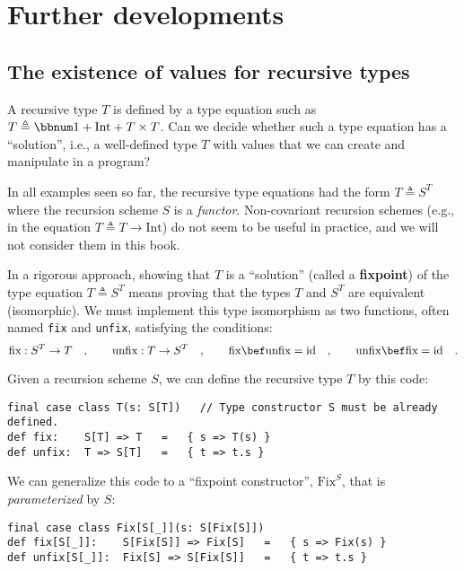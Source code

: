 \section{Further developments}

\subsection{The existence of values for recursive types\label{subsec:Recursive-types-and-the-existence-of-their-values}}

A recursive type $T$ is defined by a type equation such as $T\triangleq\bbnum 1+\text{Int}+T\times T$.
Can we decide whether such a type equation has a \textsf{``}solution\textsf{''}, i.e.,
a well-defined type $T$ with values that we can create and manipulate
in a program?

In all examples seen so far, the recursive type equations
had the form $T\triangleq S^{T}$ where the recursion scheme $S$
is a \emph{functor}. Non-covariant recursion schemes (e.g., in the
equation $T\triangleq T\rightarrow\text{Int}$) do not seem to be
useful in practice, and we will not consider them in this book.

In a rigorous approach, showing that $T$ is a \textsf{``}solution\textsf{''} (called
a \textbf{fixpoint}) of the type equation $T\triangleq S^{T}$
means proving that the types $T$ and $S^{T}$ are equivalent (isomorphic).
We must implement this type isomorphism as two functions, often named
\lstinline!fix! and \lstinline!unfix!, satisfying the conditions:
\[
\text{fix}:S^{T}\rightarrow T\quad,\quad\quad\text{unfix}:T\rightarrow S^{T}\quad,\quad\quad\text{fix}\bef\text{unfix}=\text{id}\quad,\quad\quad\text{unfix}\bef\text{fix}=\text{id}\quad.
\]

Given a recursion scheme $S$, we can define the recursive type $T$
by this code:
\begin{lstlisting}
final case class T(s: S[T])   // Type constructor S must be already defined.
def fix:    S[T] => T   =   { s => T(s) }
def unfix:  T => S[T]   =   { t => t.s }
\end{lstlisting}
We can generalize this code to a \textsf{``}fixpoint constructor\textsf{''}, $\text{Fix}^{S}$,
that is \emph{parameterized} by $S$:
\begin{lstlisting}
final case class Fix[S[_]](s: S[Fix[S]])
def fix[S[_]]:    S[Fix[S]] => Fix[S]   =   { s => Fix(s) }
def unfix[S[_]]:  Fix[S] => S[Fix[S]]   =   { t => t.s }
\end{lstlisting}

